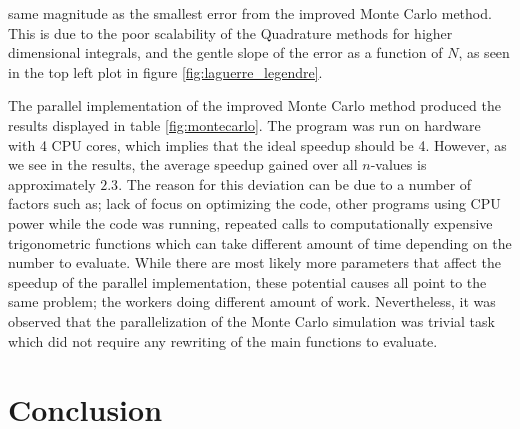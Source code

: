 \documentclass[a4paper,10pt,english]{article}
\begin{document}
same magnitude as the smallest error from the improved Monte Carlo method. This is due to the poor scalability of the Quadrature methods for higher dimensional integrals, and the gentle slope of the error as a function of $N$, as seen in the top left plot in figure \ref{fig:laguerre_legendre}. 


The parallel implementation of the improved Monte Carlo method produced the results displayed in table \ref{fig:montecarlo}. The program was run on hardware with 4 CPU cores, which implies that the ideal speedup should be 4. However, as we see in the results, the average speedup gained over all $n$-values is approximately $2.3$. The reason for this deviation can be due to a number of factors such as; lack of focus on optimizing the code, other programs using CPU power while the code was running, repeated calls to computationally expensive trigonometric functions which can take different amount of time depending on the number to evaluate. While there are most likely more parameters that affect the speedup of the parallel implementation, these potential causes all point to the same problem; the workers doing different amount of work. Nevertheless, it was observed that the parallelization of the Monte Carlo simulation was trivial task which did not require any rewriting of the main functions to evaluate. 

 \section{Conclusion}
\end{document}
